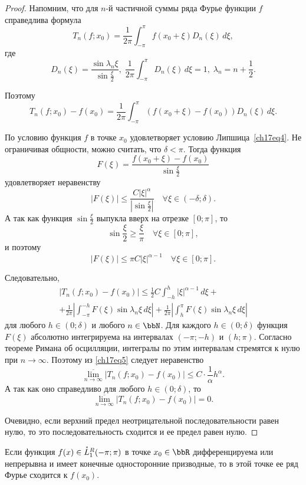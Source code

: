 \begin{proof}
Напомним, что для $n$-й частичной суммы ряда Фурье функции $f$ справедлива формула
$$
T_n(f;x_0) = \frac{1}{2\pi} \int_{-\pi}^{\pi} f(x_0 + \xi) D_n(\xi) \,d\xi,
$$
где
$$
D_n(\xi) = \frac{\sin{\lambda_n \xi}}{\sin{\frac{\xi}{2}}}, \; \frac{1}{2\pi}\int_{-\pi}^{\pi} D_n(\xi) \,d\xi = 1, \; \lambda_n = n + \frac12.
$$

Поэтому 
$$
T_n(f; x_0) - f(x_0) = \frac{1}{2\pi}\int_{-\pi}^{\pi}(f(x_0 + \xi) - f(x_0))D_n(\xi)\,d\xi.
$$

По условию функция $f$ в точке $x_0$ удовлетворяет условию Липшица~\eqref{ch17eq4}. Не ограничивая общности, можно считать, что $\delta < \pi$. Тогда функция 
$$
F(\xi) = \frac{f(x_0 + \xi) - f(x_0)}{\sin{\frac{\xi}{2}}}
$$
удовлетворяет неравенству
$$
|F(\xi)| \le \frac{C|\xi|^\alpha}{\left| \sin{\frac{\xi}{2}} \right|} \quad \forall \xi \in (-\delta; \delta).
$$
А так как функция $\sin{\frac{\xi}{2}}$ выпукла вверх на отрезке $[0; \pi]$, то
$$
\sin{\frac{\xi}{2}} \ge \frac{\xi}{\pi} \quad \forall \xi \in [0; \pi],
$$
и поэтому 
$$
|F(\xi)| \le \pi C |\xi|^{\alpha - 1} \quad \forall \xi \in [0; \pi].
$$

Следовательно,
\begin{multline} \label{ch17eq5}
|T_n(f; x_0) - f(x_0)| \le \frac{1}{2} C \int_{-h}^{h} |\xi|^{\alpha - 1}\,d\xi + \\
+ \frac{1}{2\pi} \left| \int_{-\pi}^{-h} F(\xi) \sin{\lambda_n \xi} \,d\xi \right| + \frac{1}{2\pi} \left| \int_{h}^{\pi} F(\xi) \sin{\lambda_n \xi} \,d\xi \right|
\end{multline}
для любого $h \in (0; \delta)$ и любого $n \in \bbN$. Для каждого $h \in (0;\delta)$ функция~$F(\xi)$ абсолютно интегрируема на интервалах $(-\pi; -h)$ и $(h; \pi)$. Согласно теореме Римана об осцилляции, интегралы по этим интервалам стремятся к нулю при $n \to \infty$. Поэтому из \eqref{ch17eq5} следует неравенство
$$
\overline{\lim\limits_{n \to \infty}}|T_n(f; x_0) - f(x_0)| \le C \cdot \frac{1}{\alpha}h^{\alpha}.
$$
А так как оно справедливо для любого $h \in (0; \delta)$, то 
$$
\overline{\lim\limits_{n \to \infty}}|T_n(f; x_0) - f(x_0)| = 0.
$$

Очевидно, если верхний предел неотрицательной последовательности равен нулю, то это последовательность сходится и ее предел равен нулю.
\end{proof}

\begin{cons}
Если функция $f(x) \in \accentset{*}{L}^{R}_1(-\pi;\pi)$ в точке $x_0 \in \bbR$ дифференцируема или непрерывна и имеет конечные односторонние призводные, то в этой точке ее ряд Фурье сходится к $f(x_0)$.
\end{cons}


